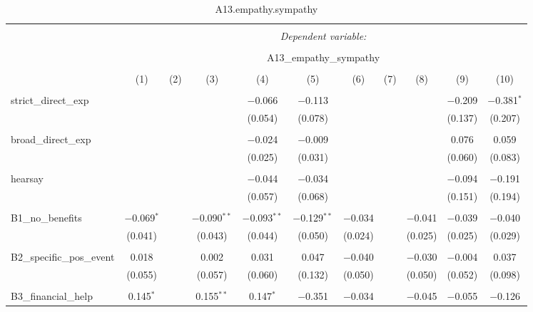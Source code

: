 
\begin{table}[H] \centering 
  \caption{A13.empathy.sympathy} 
  \label{} 
\tiny 
\begin{tabular}{@{\extracolsep{4pt}}lcccccccccc} 
\\[-1.8ex]\hline 
\hline \\[-1.8ex] 
 & \multicolumn{10}{c}{\textit{Dependent variable:}} \\ 
\cline{2-11} 
\\[-1.8ex] & \multicolumn{10}{c}{A13\_empathy\_sympathy} \\ 
\\[-1.8ex] & (1) & (2) & (3) & (4) & (5) & (6) & (7) & (8) & (9) & (10)\\ 
\hline \\[-1.8ex] 
 strict\_direct\_exp &  &  &  & $-$0.066 & $-$0.113 &  &  &  & $-$0.209 & $-$0.381$^{*}$ \\ 
  &  &  &  & (0.054) & (0.078) &  &  &  & (0.137) & (0.207) \\ 
  & & & & & & & & & & \\ 
 broad\_direct\_exp &  &  &  & $-$0.024 & $-$0.009 &  &  &  & 0.076 & 0.059 \\ 
  &  &  &  & (0.025) & (0.031) &  &  &  & (0.060) & (0.083) \\ 
  & & & & & & & & & & \\ 
 hearsay &  &  &  & $-$0.044 & $-$0.034 &  &  &  & $-$0.094 & $-$0.191 \\ 
  &  &  &  & (0.057) & (0.068) &  &  &  & (0.151) & (0.194) \\ 
  & & & & & & & & & & \\ 
 B1\_no\_benefits & $-$0.069$^{*}$ &  & $-$0.090$^{**}$ & $-$0.093$^{**}$ & $-$0.129$^{**}$ & $-$0.034 &  & $-$0.041 & $-$0.039 & $-$0.040 \\ 
  & (0.041) &  & (0.043) & (0.044) & (0.050) & (0.024) &  & (0.025) & (0.025) & (0.029) \\ 
  & & & & & & & & & & \\ 
 B2\_specific\_pos\_event & 0.018 &  & 0.002 & 0.031 & 0.047 & $-$0.040 &  & $-$0.030 & $-$0.004 & 0.037 \\ 
  & (0.055) &  & (0.057) & (0.060) & (0.132) & (0.050) &  & (0.050) & (0.052) & (0.098) \\ 
  & & & & & & & & & & \\ 
 B3\_financial\_help & 0.145$^{*}$ &  & 0.155$^{**}$ & 0.147$^{*}$ & $-$0.351 & $-$0.034 &  & $-$0.045 & $-$0.055 & $-$0.126 \\ 

\end{tabular}
\end{table}
